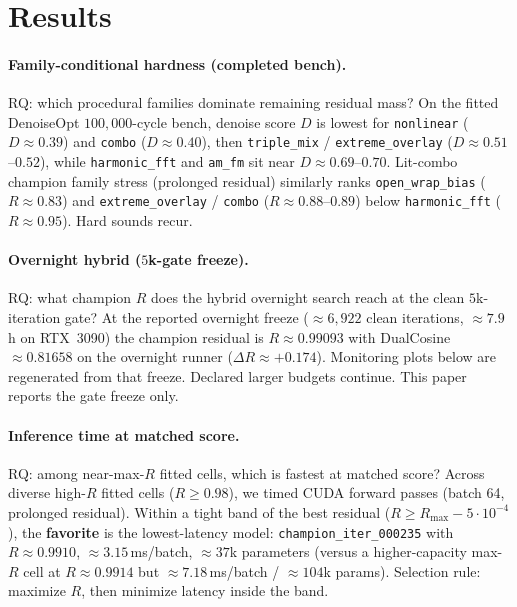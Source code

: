 \section{Results}
\label{sec:results}

\paragraph{Family-conditional hardness (completed bench).}
RQ: which procedural families dominate remaining residual mass?
On the fitted DenoiseOpt $100{,}000$-cycle bench, denoise score $D$ is lowest for \texttt{nonlinear} ($D\approx 0.39$) and \texttt{combo} ($D\approx 0.40$), then \texttt{triple\_mix} / \texttt{extreme\_overlay} ($D\approx 0.51$--$0.52$), while \texttt{harmonic\_fft} and \texttt{am\_fm} sit near $D\approx 0.69$--$0.70$.
Lit-combo champion family stress (prolonged residual) similarly ranks \texttt{open\_wrap\_bias} ($R\approx 0.83$) and \texttt{extreme\_overlay} / \texttt{combo} ($R\approx 0.88$--$0.89$) below \texttt{harmonic\_fft} ($R\approx 0.95$).
Hard sounds recur.

\paragraph{Overnight hybrid ($5$k-gate freeze).}
RQ: what champion $R$ does the hybrid overnight search reach at the clean $5$k-iteration gate?
At the reported overnight freeze ($\approx 6{,}922$ clean iterations, $\approx 7.9$\,h on RTX~3090) the champion residual is $R\approx 0.99093$ with DualCosine $\approx 0.81658$ on the overnight runner ($\Delta R\approx{+}0.174$).
Monitoring plots below are regenerated from that freeze.
Declared larger budgets continue. This paper reports the gate freeze only.

\paragraph{Inference time at matched score.}
RQ: among near-max-$R$ fitted cells, which is fastest at matched score?
Across diverse high-$R$ fitted cells ($R\ge 0.98$), we timed CUDA forward passes (batch 64, prolonged residual).
Within a tight band of the best residual ($R \ge R_{\max}-5\cdot10^{-4}$), the \textbf{favorite} is the lowest-latency model:
\texttt{champion\_iter\_000235} with $R\approx 0.9910$, $\approx 3.15$\,ms/batch, $\approx 37$k parameters
(versus a higher-capacity max-$R$ cell at $R\approx 0.9914$ but $\approx 7.18$\,ms/batch / $\approx 104$k params).
Selection rule: maximize $R$, then minimize latency inside the band.


